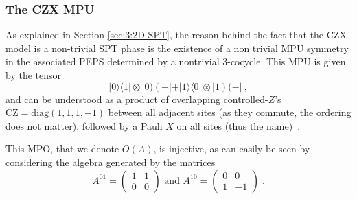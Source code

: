 \documentclass[rmp,aps,reprint,superscriptaddress,nobalancelastpage]{revtex4-1}
\newcommand{\ket}[1]{\vert#1\rangle}
\newcommand{\bra}[1]{\langle#1\vert}
\begin{document}
    \subsubsection{The CZX MPU}

    As explained in Section \ref{sec:3:2D-SPT}, the reason behind the fact that the CZX model is a non-trivial SPT phase is the existence of a non trivial MPU symmetry in the associated PEPS determined by a nontrivial 3-cocycle. This MPU is given by the tensor
    $$\ket{0}\bra{1} \otimes |0)(+|+ \ket{1}\bra{0}\otimes |1)(-|\ ,$$
    and can be understood as a product of overlapping controlled-$Z$'s $\mathrm{CZ}=\mathrm{diag}(1,1,1,-1)$ between all adjacent sites (as they commute, the ordering does not matter), followed by a Pauli $X$ on all sites (thus the name)~\cite{chen:2d-spt-phases-peps-ghz}.

    This MPO, that we denote $O(A)$, is injective, as can easily be seen by considering the algebra generated by the matrices
    $$
        A^{01}= \begin{pmatrix}1&1 \\ 0&0 \end{pmatrix} \text{ and }  A^{10}=\begin{pmatrix}0&0\\1&-1\end{pmatrix}\;.
    $$
\end{document}
